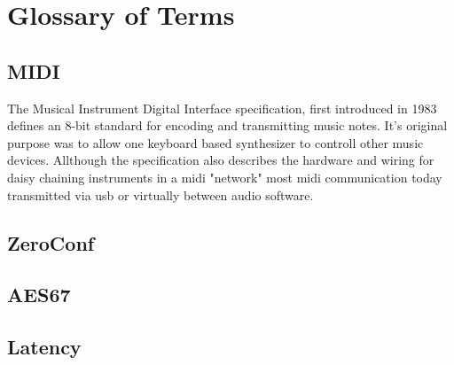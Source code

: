 \section{Glossary of Terms}

\subsection*{MIDI}
The Musical Instrument Digital Interface specification, first introduced in 1983 defines an 8-bit standard for encoding and transmitting music notes. It's original purpose was to allow one keyboard based synthesizer to controll other music devices.\cite{Boulanger:2011} Allthough the specification also describes the hardware and wiring for daisy chaining instruments in a midi "network" most midi communication today transmitted via usb or virtually between audio software.

\subsection*{ZeroConf}

\subsection*{AES67}

\subsection*{Latency}